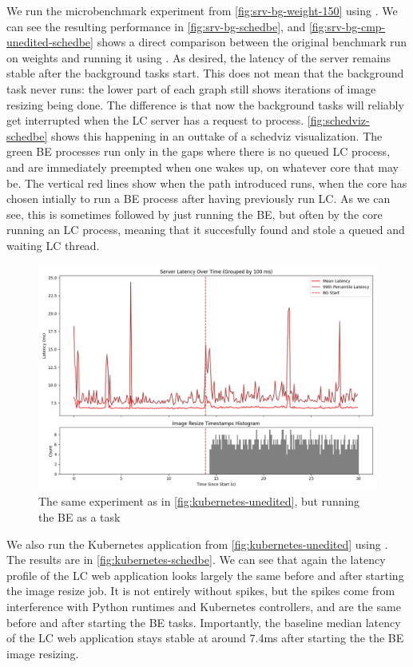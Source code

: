 We run the microbenchmark experiment from \autoref{fig:srv-bg-weight-150} using
\schedbe{}. We can see the resulting performance in
\autoref{fig:srv-bg-schedbe}, and \autoref{fig:srv-bg-cmp-unedited-schedbe}
shows a direct comparison between the original benchmark run on \cgroups{}
weights and running it using \schedbe{}. As desired, the latency of the server
remains stable after the background tasks start. This does not mean that the
background task never runs: the lower part of each graph still shows iterations
of image resizing being done. The difference is that now the background tasks
will reliably get interrupted when the LC server has a request to process.
\autoref{fig:schedviz-schedbe} shows this happening in an outtake of a schedviz
visualization. The green BE processes run only in the gaps where there is no
queued LC process, and are immediately preempted when one wakes up, on whatever
core that may be. The vertical red lines show when the \exit{} path \schedbe{}
introduced runs, \ie{} when the core has chosen intially to run a BE process
after having previously run LC. As we can see, this is sometimes followed by
just running the BE, but often by the core running an LC process, meaning that
it succesfully found and stole a queued and waiting LC thread.

\begin{figure}[t]
    \centering
    \includegraphics[width=\columnwidth]{graphs/kubernetes-schedbe.png}
    \caption{The same experiment as in \autoref{fig:kubernetes-unedited}, but
    running the BE as a \schedbe{} task}\label{fig:kubernetes-schedbe}
\end{figure}

We also run the Kubernetes application from \autoref{fig:kubernetes-unedited}
using \schedbe{}. The results are in \autoref{fig:kubernetes-schedbe}. We can
see that again the latency profile of the LC web application looks largely the
same before and after starting the image resize job. It is not entirely without spikes, but the spikes come
from interference with Python runtimes and Kubernetes controllers, and are the
same before and after starting the BE tasks. Importantly, the baseline median
latency of the LC web application stays stable at around 7.4ms after starting
the the BE image resizing. 

